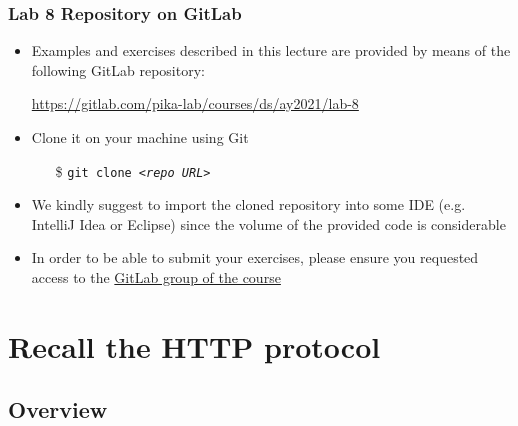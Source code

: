 \documentclass[presentation]{beamer}\mode<presentation>{\usetheme{AMSCesenaPurpleAndGold}}
\newcommand{\labN}{8}
\newcommand{\labGroup}{https://gitlab.com/pika-lab/courses/ds/ay2021}
\newcommand{\labRepo}{\labGroup/lab-\labN}
\begin{document}
\begin{frame}
\frametitle{Lab \labN{} Repository on GitLab}

	\begin{itemize}
		\item Examples and exercises described in this lecture are provided by means of the following GitLab repository:
		\begin{center}
			\url{\labRepo}
		\end{center}

		\vfill

		\item Clone it on your machine using Git
		\begin{itemize}
		    \item[\$] \texttt{git clone \textit{<repo URL>}}
		\end{itemize}

		\vfill

		\item We kindly suggest to import the cloned repository into some IDE (e.g. IntelliJ Idea or Eclipse) since the volume of the provided code is considerable

		\vfill

		\item In order to be able to submit your exercises, please ensure you requested access to the \href{\labGroup}{GitLab group of the course}
	\end{itemize}

\end{frame}


\section{Recall the HTTP protocol}

\subsection{Overview}
\end{document}
